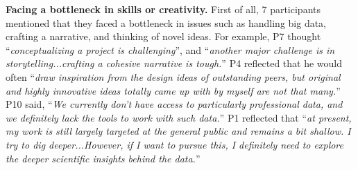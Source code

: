 \textbf{Facing a bottleneck in skills or creativity.}
First of all, 7 participants mentioned that they faced a bottleneck in issues such as handling big data, crafting a narrative, and thinking of novel ideas. For example, P7 thought ``\textit{conceptualizing a project is challenging}'', and ``\textit{another major challenge is in storytelling...crafting a cohesive narrative is tough.}''
P4 reflected that he would often ``\textit{draw inspiration from the design ideas of outstanding peers, but original and highly innovative ideas totally came up with by myself are not that many.}'' 
P10 said, ``\textit{We currently don’t have access to particularly professional data, and we definitely lack the tools to work with such data.}''
P1 reflected that ``\textit{at present, my work is still largely targeted at the general public and remains a bit shallow. I try to dig deeper...However, if I want to pursue this, I definitely need to explore the deeper scientific insights behind the data.}''

